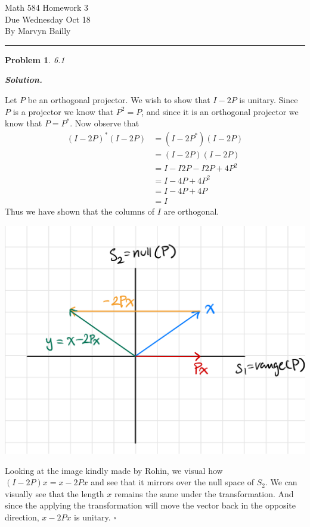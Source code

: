 \documentclass[12pt]{report}
\newtheorem{problem}{Problem}
\newenvironment{solution}[1][\it{Solution}]{\textbf{#1. } }{$\square$}
\begin{document}
\large

\begin{center}
 Math 584 Homework 3\\
 Due Wednesday Oct 18\\
 By Marvyn Bailly\\
\end{center}

\normalsize

\hrule



\begin{problem}
    6.1
\end{problem}

\begin{solution}
    \noindent
    
    Let $P$ be an orthogonal projector. We wish to show that $I - 2P$ is unitary. Since $P$ is a projector we know that $P^2 = P$, and since it is an orthogonal projector we know that $P = P^*$. Now observe that 
    \begin{align*}
        (I - 2P)^*(I - 2P) &= (I - 2P^*)(I - 2P)\\
        &= (I - 2P)(I - 2P)\\
        &= I - I2P - I2P + 4P^2\\
        &= I - 4P + 4P^2\\
        &= I - 4P + 4P\\
        &= I
    \end{align*}
    Thus we have shown that the columns of $I$ are orthogonal.

    \begin{center}
        \includegraphics[width=.4\textwidth]{fig.png}
    \end{center}

    Looking at the image kindly made by Rohin, we visual how $(I - 2P)x = x - 2Px$ and see that it mirrors over the null space of $S_2$. We can visually see that the length $x$ remains the same under the transformation. And since the applying the transformation will move the vector back in the opposite direction, $x - 2Px$ is unitary.  
\end{solution}
\end{document}

